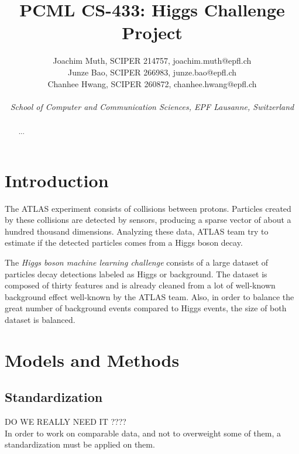 \documentclass[10pt,conference,compsocconf]{IEEEtran}
\begin{document}
\title{PCML CS-433: Higgs Challenge Project}

\author{
  Joachim Muth, SCIPER 214757, joachim.muth@epfl.ch\\
  Junze Bao, SCIPER 266983, junze.bao@epfl.ch\\
  Chanhee Hwang, SCIPER 260872, chanhee.hwang@epfl.ch\\ \\
  \textit{School of Computer and Communication Sciences, EPF Lausanne, Switzerland}
}

\maketitle

\begin{abstract}
...
\end{abstract}

\section{Introduction}
The ATLAS experiment consists of collisions between protons. Particles created by these collisions are detected by sensors, producing a sparse vector of about a hundred thousand dimensions. Analyzing these data, ATLAS team try to estimate if the detected particles comes from a Higgs boson decay.

The \emph{Higgs boson machine learning challenge} consists of a large dataset of particles decay detections labeled as Higgs or background. The dataset is composed of thirty features and is already cleaned from a lot of well-known background effect well-known by the ATLAS team. Also, in order to balance the great number of background events compared to Higgs events, the size of both dataset is balanced.~\cite{higgsChallenge}

\section{Models and Methods}

\subsection{Standardization}
{\color{red}DO WE REALLY NEED IT ????}\\
In order to work on comparable data, and not to overweight some of them, a standardization must be applied on them.
\end{document}
